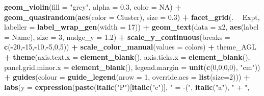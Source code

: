 \documentclass[
]{article}
\newenvironment{Shaded}{\begin{snugshade}}{\end{snugshade}}
\newcommand{\DataTypeTok}[1]{\textcolor[rgb]{0.13,0.29,0.53}{#1}}
\newcommand{\DecValTok}[1]{\textcolor[rgb]{0.00,0.00,0.81}{#1}}
\newcommand{\FloatTok}[1]{\textcolor[rgb]{0.00,0.00,0.81}{#1}}
\newcommand{\KeywordTok}[1]{\textcolor[rgb]{0.13,0.29,0.53}{\textbf{#1}}}
\newcommand{\NormalTok}[1]{#1}
\newcommand{\OperatorTok}[1]{\textcolor[rgb]{0.81,0.36,0.00}{\textbf{#1}}}
\newcommand{\OtherTok}[1]{\textcolor[rgb]{0.56,0.35,0.01}{#1}}
\newcommand{\StringTok}[1]{\textcolor[rgb]{0.31,0.60,0.02}{#1}}
\begin{document}
\begin{Shaded}
\begin{Highlighting}[]
{{{{{{{{{{{{{{\StringTok{  }\KeywordTok{geom_violin}\NormalTok{(}\DataTypeTok{fill =} \StringTok{"grey"}\NormalTok{, }\DataTypeTok{alpha =} \FloatTok{0.3}\NormalTok{, }\DataTypeTok{color =} \OtherTok{NA}\NormalTok{) }\OperatorTok{+}\StringTok{ }
\StringTok{  }\KeywordTok{geom_quasirandom}\NormalTok{(}\KeywordTok{aes}\NormalTok{(}\DataTypeTok{color =}\NormalTok{ Cluster), }\DataTypeTok{size =} \FloatTok{0.3}\NormalTok{) }\OperatorTok{+}\StringTok{ }
\StringTok{  }\KeywordTok{facet_grid}\NormalTok{(. }\OperatorTok{~}\StringTok{ }\NormalTok{Expt, }\DataTypeTok{labeller =} \KeywordTok{label_wrap_gen}\NormalTok{(}\DataTypeTok{width =} \DecValTok{17}\NormalTok{)) }\OperatorTok{+}
\StringTok{  }\KeywordTok{geom_text}\NormalTok{(}\DataTypeTok{data =}\NormalTok{ x2, }\KeywordTok{aes}\NormalTok{(}\DataTypeTok{label =}\NormalTok{ Name), }\DataTypeTok{size =} \DecValTok{3}\NormalTok{, }\DataTypeTok{nudge_y =} \FloatTok{1.2}\NormalTok{) }\OperatorTok{+}
\StringTok{  }\KeywordTok{scale_y_continuous}\NormalTok{(}\DataTypeTok{breaks =} \KeywordTok{c}\NormalTok{(}\OperatorTok{-}\DecValTok{20}\NormalTok{,}\OperatorTok{-}\DecValTok{15}\NormalTok{,}\OperatorTok{-}\DecValTok{10}\NormalTok{,}\OperatorTok{-}\DecValTok{5}\NormalTok{,}\DecValTok{0}\NormalTok{,}\DecValTok{5}\NormalTok{)) }\OperatorTok{+}
\StringTok{  }\KeywordTok{scale_color_manual}\NormalTok{(}\DataTypeTok{values =}\NormalTok{ colors) }\OperatorTok{+}
\StringTok{  }\NormalTok{theme_AGL }\OperatorTok{+}
\StringTok{  }\KeywordTok{theme}\NormalTok{(}\DataTypeTok{axis.text.x        =} \KeywordTok{element_blank}\NormalTok{(),}
        \DataTypeTok{axis.ticks.x       =} \KeywordTok{element_blank}\NormalTok{(),}
        \DataTypeTok{panel.grid.minor.x =} \KeywordTok{element_blank}\NormalTok{(),}
        \DataTypeTok{legend.margin =} \KeywordTok{unit}\NormalTok{(}\KeywordTok{c}\NormalTok{(}\DecValTok{0}\NormalTok{,}\DecValTok{0}\NormalTok{,}\DecValTok{0}\NormalTok{,}\DecValTok{0}\NormalTok{), }\StringTok{"cm"}\NormalTok{)) }\OperatorTok{+}
\StringTok{  }\KeywordTok{guides}\NormalTok{(}\DataTypeTok{colour =} \KeywordTok{guide_legend}\NormalTok{(}\DataTypeTok{nrow =} \DecValTok{1}\NormalTok{, }\DataTypeTok{override.aes =} \KeywordTok{list}\NormalTok{(}\DataTypeTok{size=}\DecValTok{2}\NormalTok{))) }\OperatorTok{+}
\StringTok{  }\KeywordTok{labs}\NormalTok{(}\DataTypeTok{y =} \KeywordTok{expression}\NormalTok{(}\KeywordTok{paste}\NormalTok{(}\KeywordTok{italic}\NormalTok{(}\StringTok{"P"}\NormalTok{)[}\KeywordTok{italic}\NormalTok{(}\StringTok{"c"}\NormalTok{)], }\StringTok{" = -("}\NormalTok{, }\KeywordTok{italic}\NormalTok{(}\StringTok{"a"}\NormalTok{), }\StringTok{" + "}\NormalTok{, }
}}}}}}}}}}}}}}
\end{Highlighting}
\end{Shaded}
\end{document}
